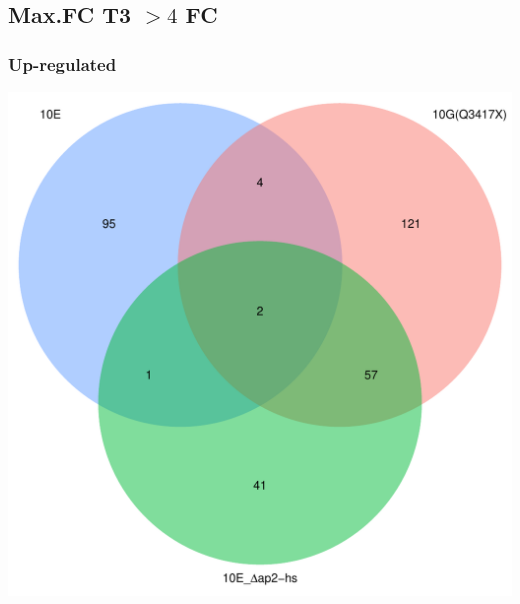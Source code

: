 \documentclass{article}\usepackage[]{graphicx}\usepackage[]{color}
\newenvironment{knitrout}{}{} %
\begin{document}
\subsection{Max.FC T3 $>4$ FC}
\subsubsection{Up-regulated}

\begin{knitrout}
\color{fgcolor}

{\centering \includegraphics[width=1\linewidth,height=.4\textheight]{figure/minimal-venn_t3_3fc_up_venn-1} 

}



\end{knitrout}
\end{document}
